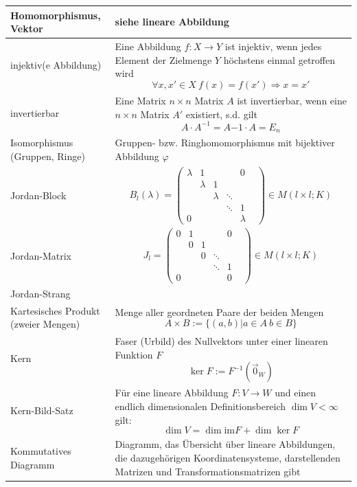 \documentclass{article}
\begin{document}
\begin{xltabular}{\linewidth}{p{0.33\textwidth}|X}
	\hline
		Homomorphismus, Vektor & siehe lineare Abbildung \\
	\hline
		injektiv(e Abbildung) & Eine Abbildung $f:X\rightarrow Y$ ist injektiv, wenn jedes Element der Zielmenge $Y$ höchstens einmal getroffen wird
			$$\forall x, x'\in X\ f(x)=f(x') \Rightarrow x=x'$$ \\
	\hline
		invertierbar & Eine Matrix $n\times n$ Matrix $A$ ist invertierbar, wenn eine $n\times n$ Matrix $A'$ existiert, s.d. gilt
			$$A\cdot A^{-1} = A{-1}\cdot A = E_n$$ \\
	\hline
		Isomorphismus (Gruppen, Ringe) & Gruppen- bzw. Ringhomomorphismus mit bijektiver Abbildung $\varphi$ \\
	\hline
		Jordan-Block &
			$$B_l(\lambda) = 
				\begin{pmatrix}
					\lambda & 1 &   &   & 0 \\
					  & \lambda & 1 &   &  \\
					  &   & \lambda & \ddots  &  \\
					  &   &   &  \ddots & 1 \\
					0 &   &   & & \lambda &
				\end{pmatrix} \in M(l\times l; K)
			$$ \\
	\hline
		Jordan-Matrix & 
			$$J_l = 
				\begin{pmatrix}
					0 & 1 &   &   & 0 \\
					  & 0 & 1 &   &  \\
					  &   & 0 & \ddots  &  \\
					  &   &   &  \ddots & 1 \\
					0 &   &   & & 0 &
				\end{pmatrix} \in M(l\times l; K)
			$$ \\
	\hline
		Jordan-Strang &  \\
	\hline
		Kartesisches Produkt (zweier Mengen) & Menge aller geordneten Paare der beiden Mengen
			$$A\times B := \{(a,b) | a\in A\ b\in B\}$$ \\
	\hline
		Kern & Faser (\textcolor{gruen}{Urbild}) des Nullvektors unter einer linearen Funktion $F$
			$$\ker F := F^{-1}(\vec{0}_W)$$ \\
	\hline
		Kern-Bild-Satz & Für eine lineare Abbildung $F:V\to W$ und einen endlich dimensionalen Definitionsbereich $\dim V < \infty$ gilt:
			$$\dim V = \dim \text{im} F + \dim\ker F$$ \\
	\hline
		Kommutatives Diagramm & Diagramm, das Übersicht über lineare Abbildungen, die dazugehörigen Koordinatensysteme, darstellenden Matrizen und Transformationsmatrizen gibt \\

\end{xltabular}
\end{document}
